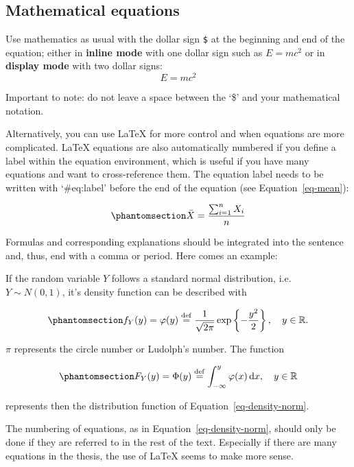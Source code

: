 \documentclass[
  letterpaper,
  DIV=11,
  numbers=noendperiod]{scrartcl}
\begin{document}
\subsection{Mathematical equations}\label{mathematical-equations}

Use mathematics as usual with the dollar sign \texttt{\$} at the
beginning and end of the equation; either in \textbf{inline mode} with
one dollar sign such as \(E = mc^2\) or in \textbf{display mode} with
two dollar signs: \[E = mc^2\]

Important to note: do not leave a space between the `\$' and your
mathematical notation.

Alternatively, you can use LaTeX for more control and when equations are
more complicated. LaTeX equations are also automatically numbered if you
define a label within the equation environment, which is useful if you
have many equations and want to cross-reference them. The equation label
needs to be written with `\#eq:label' before the end of the equation
(see Equation~\ref{eq-mean}):

\begin{equation}\phantomsection\label{eq-mean}{
  \bar{X} = \frac{\sum_{i=1}^n X_i}{n}
}\end{equation}

Formulas and corresponding explanations should be integrated into the
sentence and, thus, end with a comma or period. Here comes an example:

If the random variable \(Y\) follows a standard normal distribution,
i.e.~\(Y \sim N(0,1)\), it's density function can be described with

\begin{equation}\phantomsection\label{eq-density-norm}{
f_{Y}(y)=\varphi(y) \stackrel{\mathrm{def}}{=} \frac{1}{\sqrt{2 \pi}} \exp \left\{ -\frac{y^2}{2} \right\}, \quad y \in \mathbb{R}.
}\end{equation}

\(\pi\) represents the circle number or Ludolph's number. The function

\begin{equation}\phantomsection\label{eq-dist-func}{
  F_{Y}(y)=\Phi(y) \stackrel{\mathrm{def}}{=} \int_{-\infty}^y \varphi(x) \,\mathrm{d}x, \quad y \in \mathbb{R}
}\end{equation}

represents then the distribution function of
Equation~\ref{eq-density-norm}.

The numbering of equations, as in Equation~\ref{eq-density-norm}, should
only be done if they are referred to in the rest of the text. Especially
if there are many equations in the thesis, the use of LaTeX seems to
make more sense.
\end{document}
